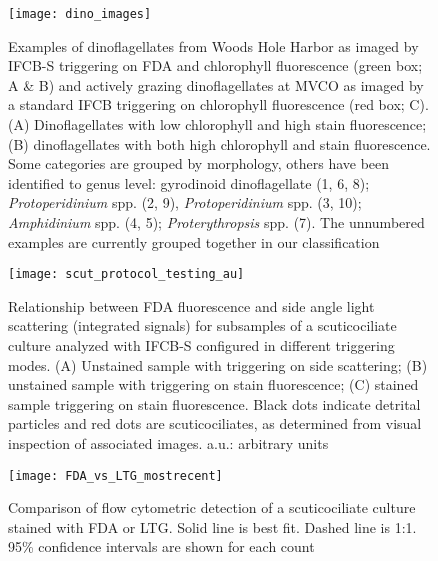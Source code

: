\newpage\begin{figure}

\graphicspath{ {Chapter2_Figures/} }
\texttt{[image: dino\_images]}
\caption [Images of heterotrophic dinoflagellates] {Examples of dinoflagellates from Woods Hole Harbor as imaged by IFCB-S triggering on FDA and chlorophyll fluorescence (green box; A \& B) and actively grazing dinoflagellates at MVCO as imaged by a standard IFCB triggering on chlorophyll
fluorescence (red box; C). (A) Dinoflagellates with low chlorophyll and high stain fluorescence; (B) dinoflagellates with both high chlorophyll and stain fluorescence. Some categories are grouped by morphology, others have been identified to genus level: gyrodinoid dinoflagellate (1, 6, 8); \textit{Protoperidinium} spp. (2, 9), \textit{Protoperidinium} spp. (3, 10); \textit{Amphidinium} spp.
(4, 5); \textit{Proterythropsis} spp. (7). The unnumbered examples are currently grouped together in our classification }
\label{arm:fig2}
\end{figure}

\begin{figure}

\graphicspath{ {Chapter2_Figures/} }
\texttt{[image: scut\_protocol\_testing\_au]}
\caption [FDA staining validation] {Relationship between FDA fluorescence and side angle light scattering (integrated signals) for subsamples of a scuticociliate culture analyzed with IFCB-S configured in different triggering modes. (A) Unstained sample with triggering on side scattering; (B) unstained sample with triggering on stain fluorescence; (C) stained sample triggering on stain fluorescence. Black dots indicate detrital particles and red dots are scuticociliates, as determined from visual inspection of associated images. a.u.: arbitrary units}
\label{arm:fig2}
\end{figure}

\begin{figure}

\graphicspath{ {Chapter2_Figures/} }
\texttt{[image: FDA\_vs\_LTG\_mostrecent]}
\caption [Comparison between FDA and LTG] {Comparison of flow cytometric detection of a scuticociliate culture stained with FDA or LTG. Solid line is best fit. Dashed line is 1:1. 95\% confidence intervals are shown for each count}
\label{arm:fig2}
\end{figure}

